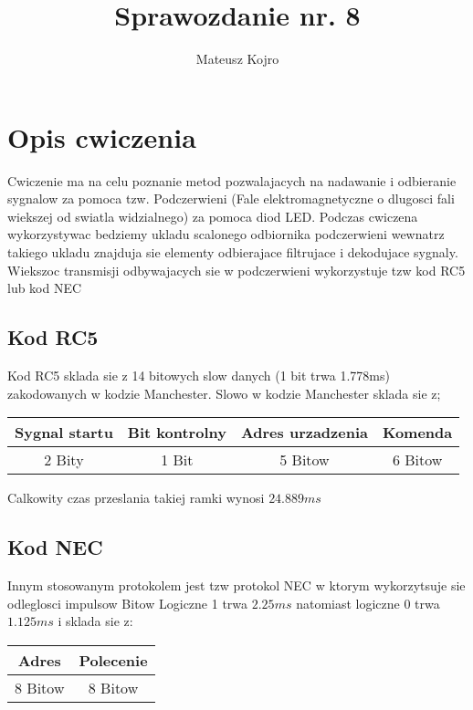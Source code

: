 \documentclass{article}
\title{Sprawozdanie nr. 8}
\author{Mateusz Kojro}
\date{}
\begin{document}
\maketitle


\section{Opis cwiczenia}

Cwiczenie ma na celu poznanie metod pozwalajacych na nadawanie i odbieranie sygnalow za pomoca tzw. Podczerwieni
(Fale elektromagnetyczne o dlugosci fali wiekszej od swiatla widzialnego) za pomoca diod LED. 
Podczas cwiczena wykorzystywac bedziemy ukladu scalonego odbiornika podczerwieni wewnatrz takiego ukladu 
znajduja sie elementy odbierajace filtrujace i dekodujace sygnaly. Wiekszoc transmisji odbywajacych sie w podczerwieni wykorzystuje tzw kod RC5 lub kod NEC

\subsection{Kod RC5}

Kod RC5 sklada sie z 14 bitowych slow danych (1 bit trwa 1.778ms) zakodowanych w kodzie Manchester. Slowo w kodzie Manchester sklada sie z;

\begin{center}
  \begin{tabular}{ |c|c|c|c| } 
  \hline
  Sygnal startu & Bit kontrolny & Adres urzadzenia & Komenda   \\
  \hline
  2 Bity & 1 Bit & 5 Bitow & 6 Bitow\\ 
  \hline
  \end{tabular}
\end{center}

Calkowity czas przeslania takiej ramki wynosi $ 24.889ms $

\subsection{Kod NEC}

Innym stosowanym protokolem jest tzw protokol NEC w ktorym wykorzytsuje sie odleglosci impulsow Bitow
Logiczne 1 trwa $2.25ms$ natomiast logiczne 0 trwa $1.125ms$ i sklada sie z:

\begin{center}
  \begin{tabular}{ |c|c| } 
  \hline
  Adres & Polecenie \\
  \hline
  8 Bitow & 8 Bitow \\ 
  \hline
  \end{tabular}
\end{center}
\end{document}
